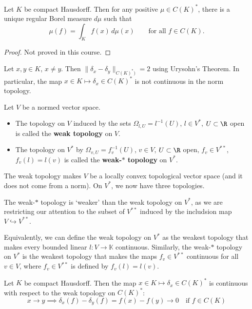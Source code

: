 \documentclass{article}
\newcommand{\K}{\mathbb{K}}
\begin{document}
\begin{thm}
    Let $K$ be compact Hausdorff. Then for any positive $\mu \in C(K)^*$, there is a unique regular Borel measure $d\mu$ such that
    \begin{equation*}
        \mu(f) = \int_K f(x) \, d\mu(x) \qquad \text{for all } f \in C(K).
    \end{equation*}
\end{thm}

\begin{proof}
    Not proved in this course.
\end{proof}

\begin{eg}
    Let $x, y \in K$, $x \neq y$. Then $\|\delta_x - \delta_y\|_{C(K)^*)} = 2$ using Urysohn's Theorem.
    In particular, the map $x \in K \mapsto \delta_x \in C(K)^*$ is not continuous in the norm topology.
\end{eg}

\begin{defi}
    Let $V$ be a normed vector space.
    \begin{itemize}
        \item The topology on $V$ induced by the sets $\Omega_{l, U} = l^{-1}(U)$, $l \in V^*$, $U \subset \R$ open is called the \textbf{weak topology} on $V$.
        \item The topology on $V^*$ by $\Omega_{v, U} = f_v^{-1}(U)$, $v \in V$, $U \subset \R$ open, $f_v \in V^{**}$, $f_v(l) = l(v)$ is called the \textbf{weak-$*$ topology} on $V^*$.
    \end{itemize}
\end{defi}

The weak topology makes $V$ be a locally convex topological vector space (and it does not come from a norm). On $V^*$, we now have three topologies.

The weak-$*$ topology is `weaker' than the weak topology on $V^*$, as we are restricting our attention to the subset of $V^{**}$ induced by the includsion map $V \hookrightarrow V^{**}$.


Equivalently, we can define the weak topology on $V^*$ as the weakest topology that makes every bounded linear $l: V \to \K$ continuous.
Similarly, the weak-$*$ topology on $V^*$ is the weakest topology that makes the maps $f_v \in V^{**}$ continuous for all $v \in V$, where $f_v \in V^{**}$ is defined by $f_v(l) = l(v)$.

\begin{eg}
    Let $K$ be compact Hausdorff. Then the map $x \in K \mapsto \delta_x \in C(K)^*$ is continuous with respect to the weak topology on $C(K)^*$:
    \begin{equation*}
        x \to y \implies \delta_x(f) - \delta_y(f) = f(x) - f(y) \to 0 \quad \text{if } f \in C(K)
    \end{equation*}
\end{eg}
\end{document}
